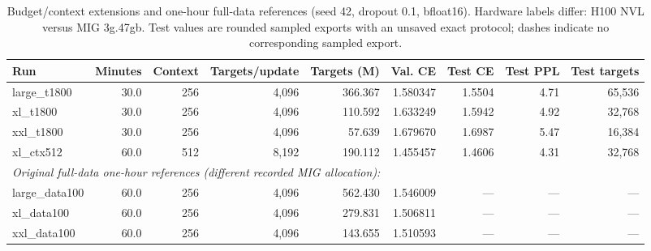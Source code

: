 \begin{table}[t]
\centering\small
\setlength{\tabcolsep}{4pt}
\caption{Budget/context extensions and one-hour full-data references (seed 42, dropout 0.1, bfloat16). Hardware labels differ: H100 NVL versus MIG 3g.47gb. Test values are rounded sampled exports with an unsaved exact protocol; dashes indicate no corresponding sampled export.}
\label{tab:extensions2}
\begin{tabular}{lrrrrrrrr}
\toprule
Run & Minutes & Context & Targets/update & Targets (M) & Val. CE & Test CE & Test PPL & Test targets\\
\midrule
large\_t1800 & 30.0 & 256 & 4,096 & 366.367 & 1.580347 & 1.5504 & 4.71 & 65,536\\
xl\_t1800 & 30.0 & 256 & 4,096 & 110.592 & 1.633249 & 1.5942 & 4.92 & 32,768\\
xxl\_t1800 & 30.0 & 256 & 4,096 & 57.639 & 1.679670 & 1.6987 & 5.47 & 16,384\\
xl\_ctx512 & 60.0 & 512 & 8,192 & 190.112 & 1.455457 & 1.4606 & 4.31 & 32,768\\
\midrule
\multicolumn{9}{l}{\textit{Original full-data one-hour references (different recorded MIG allocation):}}\\
large\_data100 & 60.0 & 256 & 4,096 & 562.430 & 1.546009 & --- & --- & ---\\
xl\_data100 & 60.0 & 256 & 4,096 & 279.831 & 1.506811 & --- & --- & ---\\
xxl\_data100 & 60.0 & 256 & 4,096 & 143.655 & 1.510593 & --- & --- & ---\\
\bottomrule
\end{tabular}
\end{table}
